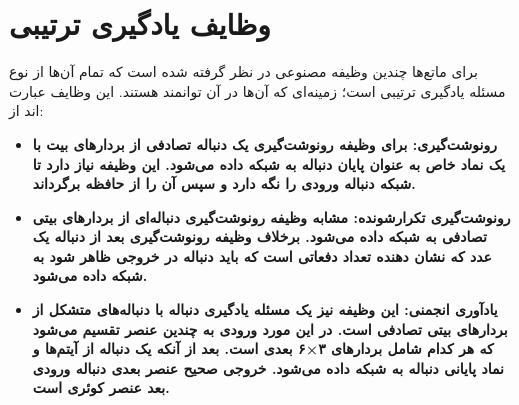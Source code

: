\section{وظایف یادگیری ترتیبی}
برای ماتع‌ها چندین وظیفه مصنوعی در نظر گرفته شده است که تمام آن‌ها از نوع مسئله یادگیری ترتیبی است؛ زمینه‌ای که آن‌ها در آن توانمند هستند. این وظایف عبارت اند از:
\begin{itemize}
\item \bf{رونوشت‌گیری}:
برای وظیفه رونوشت‌گیری یک دنباله تصادفی از بردارهای بیت با یک نماد خاص به عنوان پایان دنباله به شبکه داده می‌شود. این وظیفه نیاز دارد تا شبکه دنباله ورودی را نگه دارد و سپس آن را از حافظه برگرداند.

\item \bf{رونوشت‌گیری تکرارشونده}:
مشابه وظیفه رونوشت‌گیری دنباله‌ای از بردارهای بیتی تصادفی به شبکه داده می‌شود. برخلاف وظیفه رونوشت‌گیری بعد از دنباله یک عدد که نشان دهنده تعداد دفعاتی است که باید دنباله در خروجی ظاهر شود به شبکه داده می‌شود.

\item \bf{یادآوری انجمنی}:
این وظیفه نیز یک مسئله یادگیری دنباله با دنباله‌های متشکل از بردارهای بیتی تصادفی است. در این مورد ورودی به چندین عنصر تقسیم می‌شود که هر کدام شامل بردارهای ۳×۶ بعدی است. بعد از آنکه یک دنباله از آیتم‌ها و نماد پایانی دنباله به شبکه داده می‌شود. خروجی صحیح عنصر بعدی دنباله ورودی بعد عنصر کوئری است. 

\end{itemize}